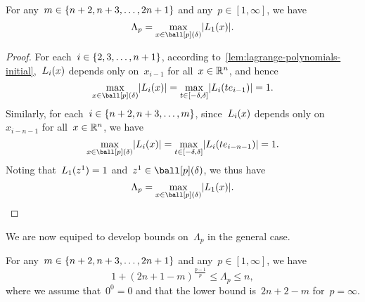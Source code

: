 \begin{lemma}
    \label{lem:lambda-poisedness-initial-simple}
    For any~$m \in \{n + 2, n + 3, \dots, 2n + 1\}$ and any~$p \in [1, \infty]$, we have
    \begin{equation}
        \label{eq:lambda-poisedness-initial-simple}
        \Lambda_p = \max_{x \in \ball[p](\delta)} \abs{\lagp[1](x)}.
    \end{equation}
\end{lemma}

\begin{proof}
    For each~$i \in \{2, 3, \dots, n + 1\}$, according to~\cref{lem:lagrange-polynomials-initial},~$\lagp[i](x)$ depends only on~$x_{i - 1}$ for all~$x \in \mathbb{R}^n$, and hence
    \begin{equation*}
        \max_{x \in \ball[p](\delta)} \abs{\lagp[i](x)} = \max_{t \in [-\delta, \delta]} \abs{\lagp[i](t e_{i - 1})} = 1.
    \end{equation*}
    Similarly, for each~$i \in \{n + 2, n + 3, \dots, m\}$, since~$\lagp[i](x)$ depends only on~$x_{i - n - 1}$ for all~$x \in \mathbb{R}^n$, we have
    \begin{equation*}
        \max_{x \in \ball[p](\delta)} \abs{\lagp[i](x)} = \max_{t \in [-\delta, \delta]} \abs{\lagp[i](t e_{i - n - 1})} = 1.
    \end{equation*}
    Noting that~$\lagp[1](z^1) = 1$ and~$z^1 \in \ball[p](\delta)$, we thus have
    \begin{equation*}
        \Lambda_p = \max_{x \in \ball[p](\delta)} \abs{\lagp[1](x)}.
    \end{equation*}
\end{proof}

We are now equiped to develop bounds on~$\Lambda_p$ in the general case.

\begin{theorem}
    \label{thm:lambda-poisedness-initial}
    For any~$m \in \{n + 2, n + 3, \dots, 2n + 1\}$ and any~$p \in [1, \infty]$, we have
    \begin{equation*}
        1 + (2n + 1 - m)^{\frac{p - 1}{p}} \le \Lambda_p \le n,
    \end{equation*}
    where we assume that~$0^0 = 0$ and that the lower bound is~$2n + 2 - m$ for~$p = \infty$.
\end{theorem}

